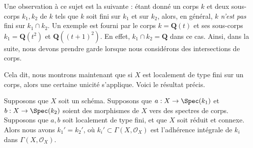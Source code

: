\medskip\noindent
Une observation à ce sujet est la suivante : étant donné un
corps $k$ et deux sous-corps $k_1, k_2$ de $k$ tels que $k$
soit fini sur $k_1$ et sur $k_2$, alors, en général, $k$ {\it
n'est pas } fini sur $k_1 \cap k_2$. Un exemple est fourni par
le corps $k = \mathbf{Q}(t)$ et ses sous-corps $k_1 =
\mathbf{Q}(t^2)$ et $\mathbf{Q}((t + 1)^2)$. En effet, $k_1 \cap
k_2 = \mathbf{Q}$ dans ce cas. Ainsi, dans la suite, nous devons
prendre garde lorsque nous considérons des intersections de corps.

\medskip\noindent
Cela dit, nous montrons maintenant que si $X$ est
localement de type fini sur un corps, alors une
certaine unicité s'applique. Voici le résultat précis.

\begin{proposition}
\label{proposition-unique-base-field}
Supposons que $X$ soit un schéma. Supposons que $a : X \to
\Spec(k_1)$ et $b : X \to \Spec(k_2)$ soient des morphismes de
$X$ vers des spectres de corps. Supposons que $a, b$ soit
localement de type fini, et que $X$ soit réduit et connexe. Alors
nous avons $k_1' = k_2'$, où $k_i' \subset \Gamma(X, \mathcal{O}_X)$
est l'adhérence intégrale de $k_i$ dans $\Gamma(X, \mathcal{O}_X)$.
\end{proposition}

